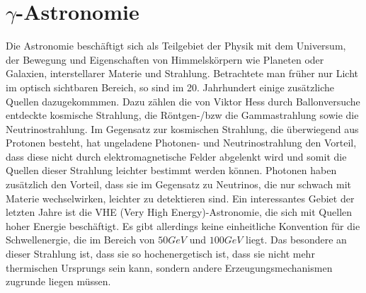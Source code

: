 \chapter{$\gamma$-Astronomie} 
\label{ch:gamma}
Die Astronomie beschäftigt sich als Teilgebiet der Physik mit dem Universum, der Bewegung und Eigenschaften von Himmelskörpern wie Planeten oder Galaxien, interstellarer Materie und Strahlung. Betrachtete man früher nur Licht im optisch sichtbaren Bereich, so sind im 20. Jahrhundert einige zusätzliche Quellen dazugekommmen. Dazu zählen die von Viktor Hess durch Ballonversuche entdeckte kosmische Strahlung, die Röntgen-/bzw die Gammastrahlung sowie die Neutrinostrahlung. Im Gegensatz zur kosmischen Strahlung, die überwiegend aus Protonen besteht, hat ungeladene Photonen- und Neutrinostrahlung den Vorteil, dass diese nicht durch elektromagnetische Felder abgelenkt wird und somit die Quellen dieser Strahlung leichter bestimmt werden können. Photonen haben zusätzlich den Vorteil, dass sie im Gegensatz zu Neutrinos, die nur schwach mit Materie wechselwirken, leichter zu detektieren sind. Ein interessantes Gebiet der letzten Jahre ist die VHE (Very High Energy)-Astronomie, die sich mit Quellen hoher  Energie beschäftigt. Es gibt allerdings keine einheitliche Konvention für die Schwellenergie, die im Bereich von $50 \unit{GeV}$ \cite{TeVCat2} und $100 \unit{GeV}$ \cite{DesignConcept} liegt. Das besondere an dieser Strahlung ist, dass sie so hochenergetisch ist, dass sie nicht mehr thermischen Ursprungs sein kann, sondern andere Erzeugungsmechanismen zugrunde liegen müssen.


